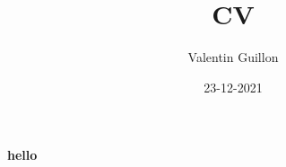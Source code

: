 \documentclass{article}
\author{Valentin Guillon}
\title{CV}
\date{23-12-2021}
\begin{document}
\maketitle
\textbf{hello}
\end{document}
